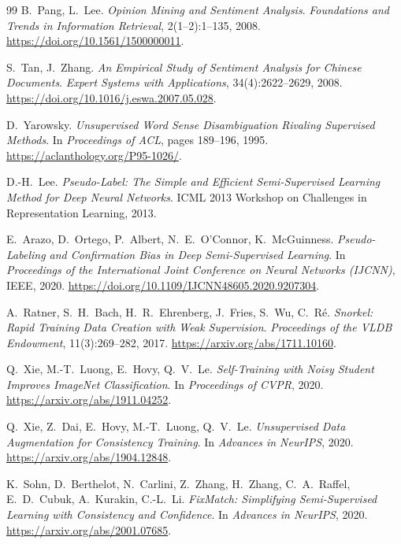 \documentclass[11pt,a4paper]{article}
\begin{document}
\begin{thebibliography}{99}
B.~Pang, L.~Lee.
\newblock \emph{Opinion Mining and Sentiment Analysis}.
\newblock \emph{Foundations and Trends in Information Retrieval}, 2(1--2):1--135, 2008.
\newblock \url{https://doi.org/10.1561/1500000011}.

S.~Tan, J.~Zhang.
\newblock \emph{An Empirical Study of Sentiment Analysis for Chinese Documents}.
\newblock \emph{Expert Systems with Applications}, 34(4):2622--2629, 2008.
\newblock \url{https://doi.org/10.1016/j.eswa.2007.05.028}.

D.~Yarowsky.
\newblock \emph{Unsupervised Word Sense Disambiguation Rivaling Supervised Methods}.
\newblock In \emph{Proceedings of ACL}, pages 189--196, 1995.
\newblock \url{https://aclanthology.org/P95-1026/}.

D.-H.~Lee.
\newblock \emph{Pseudo-Label: The Simple and Efficient Semi-Supervised Learning Method for Deep Neural Networks}.
\newblock ICML 2013 Workshop on Challenges in Representation Learning, 2013.

E.~Arazo, D.~Ortego, P.~Albert, N.~E.~O'Connor, K.~McGuinness.
\newblock \emph{Pseudo-Labeling and Confirmation Bias in Deep Semi-Supervised Learning}.
\newblock In \emph{Proceedings of the International Joint Conference on
Neural Networks (IJCNN)}, IEEE, 2020.
\newblock \url{https://doi.org/10.1109/IJCNN48605.2020.9207304}.

A.~Ratner, S.~H.~Bach, H.~R.~Ehrenberg, J.~Fries, S.~Wu, C.~R\'e.
\newblock \emph{Snorkel: Rapid Training Data Creation with Weak Supervision}.
\newblock \emph{Proceedings of the VLDB Endowment}, 11(3):269--282, 2017.
\newblock \url{https://arxiv.org/abs/1711.10160}.

Q.~Xie, M.-T.~Luong, E.~Hovy, Q.~V.~Le.
\newblock \emph{Self-Training with Noisy Student Improves ImageNet Classification}.
\newblock In \emph{Proceedings of CVPR}, 2020.
\newblock \url{https://arxiv.org/abs/1911.04252}.

Q.~Xie, Z.~Dai, E.~Hovy, M.-T.~Luong, Q.~V.~Le.
\newblock \emph{Unsupervised Data Augmentation for Consistency Training}.
\newblock In \emph{Advances in NeurIPS}, 2020.
\newblock \url{https://arxiv.org/abs/1904.12848}.

K.~Sohn, D.~Berthelot, N.~Carlini, Z.~Zhang, H.~Zhang, C.~A.~Raffel,
E.~D.~Cubuk, A.~Kurakin, C.-L.~Li.
\newblock \emph{FixMatch: Simplifying Semi-Supervised Learning with Consistency and Confidence}.
\newblock In \emph{Advances in NeurIPS}, 2020.
\newblock \url{https://arxiv.org/abs/2001.07685}.


\end{thebibliography}
\end{document}
